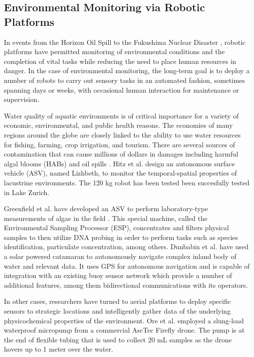 	\subsection{Environmental Monitoring via Robotic Platforms}%

		In events from the Horizon Oil Spill \cite{dssoa} to the Fukushima Nuclear Disaster \cite{Hasegawa2012}, robotic platforms have permitted monitoring of environmental conditions and the completion of vital tasks while reducing the need to place human resources in danger. In the case of environmental monitoring, the long-term goal is to deploy a number of robots to carry out sensory tasks in an automated fashion, sometimes spanning days or weeks, with occasional human interaction for maintenance or supervision.

		Water quality of aquatic environments is of critical importance for a variety of economic, environmental, and public health reasons. The economies of many regions around the globe are closely linked to the ability to use water resources for fishing, farming, crop irrigation, and tourism. There are several sources of contamination that can cause millions of dollars in damages including harmful algal blooms (HABs) and oil spills \cite{EPA2015a}. Hitz et al. \cite{Hitz2012} design an autonomous surface vehicle (ASV), named Lizhbeth,  to monitor the temporal-spatial properties of lacustrine environments. The 120 kg robot has been tested been succesfully tested in Lake Zurich. 

		Greenfield et al. have developed an ASV to perform laboratory-type measurements of algae in the field \cite{Greenfield2008}. This special machine, called the Environmental Sampling Processor (ESP), concentrates and filters physical samples to then utilize DNA probing in order to perform tasks such as species identification, particulate concentration, among others. Dunbabin et al. \cite{Dunbabin2009} have used a solar powered catamaran to autonomously navigate complex inland body of water and relevant data. It uses GPS for autonomous navigation and is capable of integration with an existing buoy sensor network which provide a number of additional features, among them bidirectional communications with its operators.  

		In other cases, researchers have turned to aerial platforms to deploy specific sensors to strategic locations and intelligently gather data of the underlying physicochemical properties of the environment. Ore et al. \cite{Ore2015} employed a slung-load waterproof micropump from a commercial AscTec Firefly drone. The pump is at the end of flexible tubing that is used to collect 20 mL samples as the drone hovers up to 1 meter over the water. 
		
